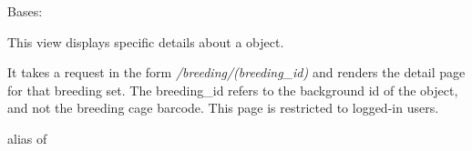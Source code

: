 \documentclass[letterpaper,10pt,english]{sphinxmanual}
\begin{document}

\begin{fulllineitems}
\label{api:mousedb.animal.views.BreedingDetail}
Bases: {\hyperref[api:mousedb.views.ProtectedDetailView]{}}

This view displays specific details about a {\hyperref[api:mousedb.animal.models.Breeding]{}} object.

It takes a request in the form \emph{/breeding/(breeding\_id)} and renders the detail page for that breeding set.
The breeding\_id refers to the background id of the {\hyperref[api:mousedb.animal.models.Breeding]{}} object, and not the breeding cage barcode.
This page is restricted to logged-in users.

\begin{fulllineitems}
\label{api:mousedb.animal.views.BreedingDetail.context_object_name}
\end{fulllineitems}


\begin{fulllineitems}
\label{api:mousedb.animal.views.BreedingDetail.model}
alias of 

\end{fulllineitems}


\begin{fulllineitems}
\label{api:mousedb.animal.views.BreedingDetail.template_name}
\end{fulllineitems}


\end{fulllineitems}

\end{document}
